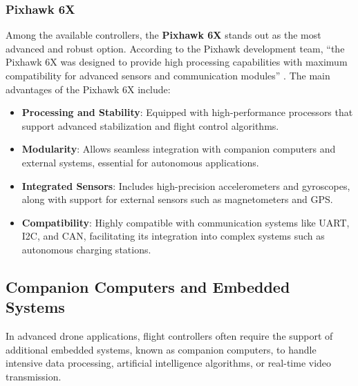 \subsubsection{Pixhawk 6X}

Among the available controllers, the \textbf{Pixhawk 6X} stands out as the most advanced and robust option. According to the Pixhawk development team, “the Pixhawk 6X was designed to provide high processing capabilities with maximum compatibility for advanced sensors and communication modules” \cite{pixhawk_docs}. The main advantages of the Pixhawk 6X include:
\begin{itemize}
    \item \textbf{Processing and Stability}: Equipped with high-performance processors that support advanced stabilization and flight control algorithms.
    \item \textbf{Modularity}: Allows seamless integration with companion computers and external systems, essential for autonomous applications.
    \item \textbf{Integrated Sensors}: Includes high-precision accelerometers and gyroscopes, along with support for external sensors such as magnetometers and GPS.
    \item \textbf{Compatibility}: Highly compatible with communication systems like UART, I2C, and CAN, facilitating its integration into complex systems such as autonomous charging stations.
\end{itemize}

\subsection{Companion Computers and Embedded Systems}

In advanced drone applications, flight controllers often require the support of additional embedded systems, known as companion computers, to handle intensive data processing, artificial intelligence algorithms, or real-time video transmission.

